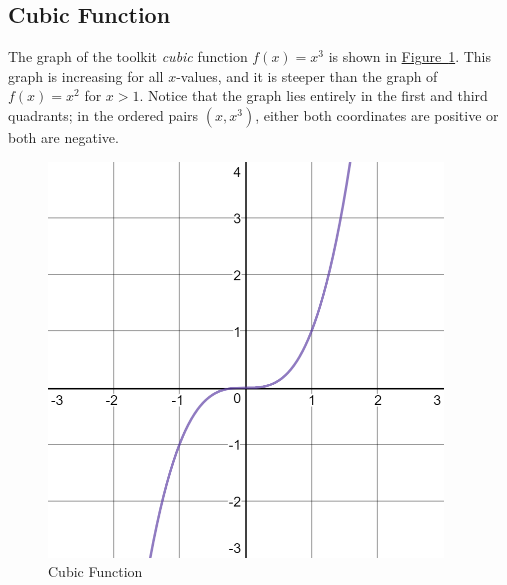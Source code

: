 \documentclass[10pt,]{book}
\theoremstyle{ptxdefinitionnotitle}
\theoremstyle{ptxdefinitiontitle}
\numberwithin{equation}{section}
\newcommand{\gt}{>}
\begin{document}
\subsection[{Cubic Function}]{Cubic Function}\label{subsection-5}
\hypertarget{p-45}{}%
The graph of the toolkit \emph{cubic} function  \(f(x) =x^3\) is shown in \hyperref[chapter02-section02-cubic]{Figure~\ref{chapter02-section02-cubic}}.  This graph is increasing for all \(x\)-values, and it is steeper than the graph of \(f(x) = x^2\) for \(x \gt 1\). Notice that the graph lies entirely in the first and third quadrants; in the ordered pairs \(\left( x, x^3 \right)\), either both coordinates are positive or both are negative.%
\begin{figure}
\centering
\includegraphics[width=0.5\linewidth]{./src/images/chapter02/chapter02section02-cubic.png}
\caption{Cubic Function\label{chapter02-section02-cubic}}
\end{figure}
\typeout{************************************************}
\typeout{************************************************}
\end{document}

